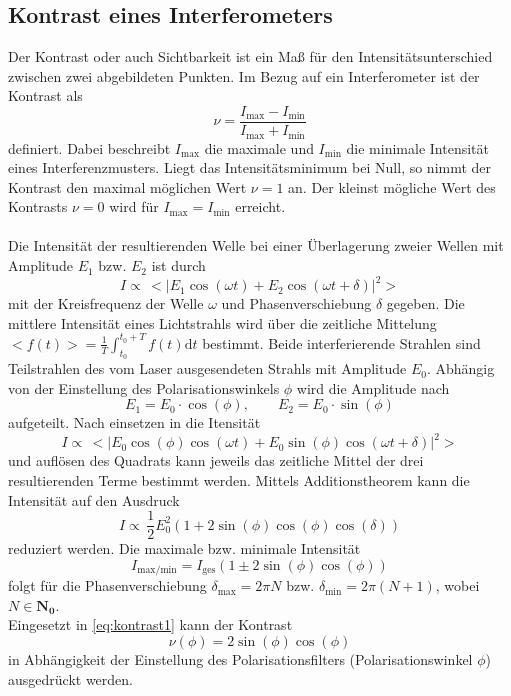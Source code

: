 \subsection{Kontrast eines Interferometers}
Der Kontrast oder auch Sichtbarkeit ist ein Maß für den Intensitätsunterschied zwischen zwei abgebildeten Punkten.
Im Bezug auf ein Interferometer ist der Kontrast als
\begin{equation}
    \nu = \frac{I_\text{max}-I_\text{min}}{I_\text{max}+I_\text{min}}
    \label{eq:kontrast1}
\end{equation}
definiert.
Dabei beschreibt $I_\text{max}$ die maximale und $I_\text{min}$ die minimale Intensität eines Interferenzmusters.
Liegt das Intensitätsminimum bei Null, so nimmt der Kontrast den maximal möglichen Wert $\nu=1$ an.
Der kleinst mögliche Wert des Kontrasts $\nu=0$ wird für $I_\text{max}=I_\text{min}$ erreicht.
\\
\\
Die Intensität der resultierenden Welle bei einer Überlagerung zweier Wellen mit Amplitude $E_1$ bzw. $E_2$ ist durch
\begin{equation*}
    I \propto \, <|E_1 \cos(\omega t) + E_2 \cos(\omega t + \delta)|^2>
\end{equation*}
mit der Kreisfrequenz der Welle $\omega$ und Phasenverschiebung $\delta$ gegeben.
Die mittlere Intensität eines Lichtstrahls wird über die zeitliche Mittelung $<f(t)> = \frac{1}{T} \int_{t_0}^{t_0 + T} f(t) \mathrm{d}t$ bestimmt.
Beide interferierende Strahlen sind Teilstrahlen des vom Laser ausgesendeten Strahls mit Amplitude $E_0$.
Abhängig von der Einstellung des Polarisationswinkels $\phi$ wird die Amplitude nach
\begin{equation*}
    E_1 = E_0 \cdot \cos(\phi), \qquad E_2 = E_0 \cdot \sin(\phi)
\end{equation*}
aufgeteilt.
Nach einsetzen in die Itensität
\begin{equation*}
    I \propto \, <|E_0 \cos(\phi) \cos(\omega t) + E_0 \sin(\phi)\cos(\omega t + \delta)|^2>
\end{equation*}
und auflösen des Quadrats kann jeweils das zeitliche Mittel der drei resultierenden Terme bestimmt werden.
Mittels Additionstheorem kann die Intensität auf den Ausdruck
\begin{equation*}
    I \propto \, \frac{1}{2} E_0^2 ( 1 + 2 \sin(\phi) \cos(\phi) \cos(\delta) ) 
\end{equation*}
reduziert werden.
Die maximale bzw. minimale Intensität
\begin{equation*}
    I_\text{max/min} = I_\text{ges} (1 \pm 2 \sin(\phi) \cos(\phi))
\end{equation*}
folgt für die Phasenverschiebung $\delta_\text{max} = 2\pi N$ bzw. $\delta_\text{min} = 2\pi (N+1)$, wobei $N \in \mathbf{N_0}$.
\\
Eingesetzt in \autoref{eq:kontrast1} kann der Kontrast
\begin{equation}
    \nu (\phi) = 2 \sin(\phi) \cos(\phi)
    \label{eq:kontrast2}
\end{equation}
in Abhängigkeit der Einstellung des Polarisationsfilters (Polarisationswinkel $\phi$) ausgedrückt werden.

